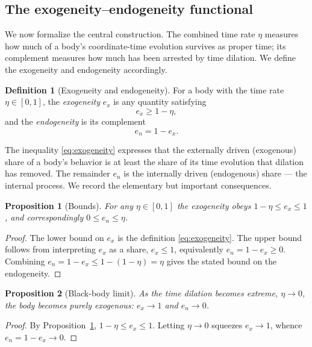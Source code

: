 \documentclass[10pt]{article}
\newtheorem{proposition}{Proposition}
\theoremstyle{definition}
\newtheorem{definition}{Definition}
\theoremstyle{remark}
\begin{document}
\subsection{The exogeneity--endogeneity functional}

We now formalize the central construction. The combined time rate $\eta$ measures how much of a body's coordinate-time evolution survives as proper time; its complement measures how much has been arrested by time dilation. We define the exogeneity and endogeneity accordingly.

\begin{definition}[Exogeneity and endogeneity]
For a body with the time rate $\eta \in [0,1]$, the \emph{exogeneity} $e_x$ is any quantity satisfying
\begin{equation}\label{eq:exogeneity}
e_x \geq 1 - \eta,
\end{equation}
and the \emph{endogeneity} is its complement
\begin{equation}\label{eq:endogeneity}
e_n = 1 - e_x.
\end{equation}
\end{definition}

The inequality \eqref{eq:exogeneity} expresses that the externally driven (exogenous) share of a body's behavior is at least the share of its time evolution that dilation has removed. The remainder $e_n$ is the internally driven (endogenous) share --- the internal process. We record the elementary but important consequences.

\begin{proposition}[Bounds]\label{prop:bounds}
For any $\eta \in [0,1]$ the exogeneity obeys $1 - \eta \le e_x \le 1$, and correspondingly $0 \le e_n \le \eta$.
\end{proposition}
\begin{proof}
The lower bound on $e_x$ is the definition \eqref{eq:exogeneity}. The upper bound follows from interpreting $e_x$ as a share, $e_x \le 1$, equivalently $e_n = 1 - e_x \ge 0$. Combining $e_n = 1 - e_x \le 1 - (1 - \eta) = \eta$ gives the stated bound on the endogeneity.
\end{proof}

\begin{proposition}[Black-body limit]\label{prop:bb-limit}
As the time dilation becomes extreme, $\eta \to 0$, the body becomes purely exogenous: $e_x \to 1$ and $e_n \to 0$.
\end{proposition}
\begin{proof}
By Proposition~\ref{prop:bounds}, $1 - \eta \le e_x \le 1$. Letting $\eta \to 0$ squeezes $e_x \to 1$, whence $e_n = 1 - e_x \to 0$.
\end{proof}
\end{document}
